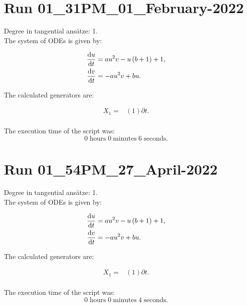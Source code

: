 \section*{Run 01\_31PM\_01\_February-2022}
Degree in tangential ansätze:	1.\\
The system of ODEs is given by:

\begin{align*}
\dv{u}{t}&=a u^{2} v - u \left(b + 1\right) + 1,\\
\dv{v}{t}&=- a u^{2} v + b u.\\
\end{align*}

\noindent The calculated generators are:

\begin{align*}
X_{1}=&\left(1 \right)\partial t.\\
\end{align*}

\noindent The execution time of the script was:
$$0\;\mathrm{hours}\;0\;\mathrm{minutes}\;6 \;\mathrm{seconds}.$$
\section*{Run 01\_54PM\_27\_April-2022}
Degree in tangential ansätze:	1.\\
The system of ODEs is given by:

\begin{align*}
\dv{u}{t}&=a u^{2} v - u \left(b + 1\right) + 1,\\
\dv{v}{t}&=- a u^{2} v + b u.\\
\end{align*}

\noindent The calculated generators are:

\begin{align*}
X_{1}=&\left(1 \right)\partial t.\\
\end{align*}

\noindent The execution time of the script was:
$$0\;\mathrm{hours}\;0\;\mathrm{minutes}\;4 \;\mathrm{seconds}.$$
